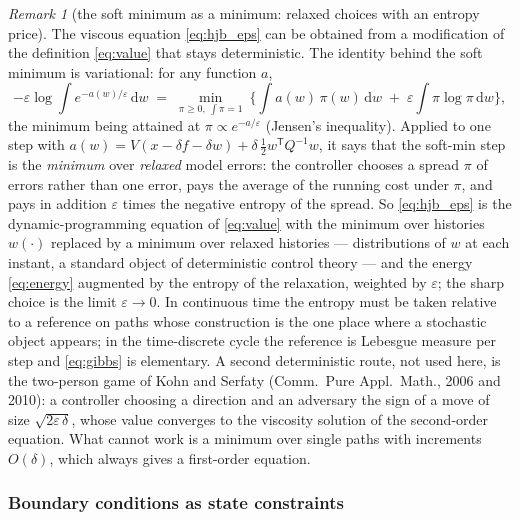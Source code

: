 \documentclass[11pt,a4paper]{article}
\newcommand{\dd}{\,\mathrm{d}}
\newcommand{\T}{^{\mathsf T}}
\newcommand{\eps}{\varepsilon}
\theoremstyle{plain}
\theoremstyle{definition}
\theoremstyle{remark}
\newtheorem{remark}{Remark}
\begin{document}
\begin{remark}[the soft minimum as a minimum: relaxed choices with an entropy price]
\label{rem:gibbs}
The viscous equation \eqref{eq:hjb_eps} can be obtained from a modification of the definition \eqref{eq:value} that stays deterministic. The identity behind the soft minimum is variational: for any function $a$,
\begin{equation}
  -\eps\log\int e^{-a(w)/\eps}\dd w \;=\; \min_{\pi\ge0,\ \int\pi=1}\ \Big\{\int a(w)\,\pi(w)\dd w \;+\; \eps\int\pi\log\pi\dd w\Big\},
  \label{eq:gibbs}
\end{equation}
the minimum being attained at $\pi\propto e^{-a/\eps}$ (Jensen's inequality). Applied to one step with $a(w)=V(x-\delta f-\delta w)+\delta\,\tfrac12w\T Q^{-1}w$, it says that the soft-min step is the \emph{minimum} over \emph{relaxed} model errors: the controller chooses a spread $\pi$ of errors rather than one error, pays the average of the running cost under $\pi$, and pays in addition $\eps$ times the negative entropy of the spread. So \eqref{eq:hjb_eps} is the dynamic-programming equation of \eqref{eq:value} with the minimum over histories $w(\cdot)$ replaced by a minimum over relaxed histories --- distributions of $w$ at each instant, a standard object of deterministic control theory --- and the energy \eqref{eq:energy} augmented by the entropy of the relaxation, weighted by $\eps$; the sharp choice is the limit $\eps\to0$. In continuous time the entropy must be taken relative to a reference on paths whose construction is the one place where a stochastic object appears; in the time-discrete cycle the reference is Lebesgue measure per step and \eqref{eq:gibbs} is elementary. A second deterministic route, not used here, is the two-person game of Kohn and Serfaty (Comm.\ Pure Appl.\ Math., 2006 and 2010): a controller choosing a direction and an adversary the sign of a move of size $\sqrt{2\eps\,\delta}$, whose value converges to the viscosity solution of the second-order equation. What cannot work is a minimum over single paths with increments $O(\delta)$, which always gives a first-order equation.
\end{remark}

\subsubsection{Boundary conditions as state constraints}
\label{sec:bc}
\end{document}
